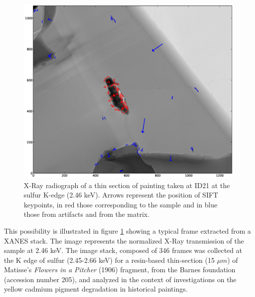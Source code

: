 \documentclass[preprint]{iucr}
\begin{document}
\begin{figure}
\label{fig:sample}
\begin{center}
\includegraphics[width=15cm]{features.eps}
\caption{ X-Ray radiograph of a thin section of painting
taken at ID21 at the sulfur K-edge (2.46 keV). Arrows represent the position of
SIFT keypoints, in red those corresponding to the sample and in blue those from
artifacts and from the matrix.}
\end{center}
\end{figure}

This possibility is illustrated in figure \ref{fig:sample} showing a typical
frame extracted from a XANES stack.
The image represents the normalized X-Ray transmission of the sample at 2.46
keV.
The image stack, composed of 346 frames was collected at the K edge of sulfur
(2.45-2.66 keV) for a resin-based thin-section
(15 $\mu m$) of Matisse’s \emph{Flowers in a Pitcher} (1906) fragment, from the
Barnes foundation (accession number 205), and analyzed in the context of
investigations on the yellow cadmium pigment degradation in historical
paintings.
\end{document}
